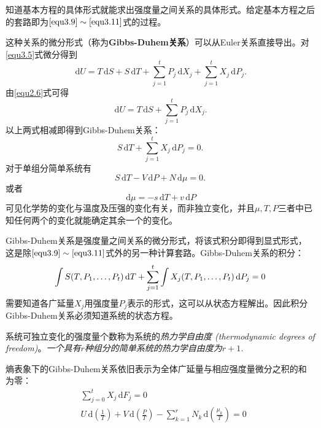 知道基本方程的具体形式就能求出强度量之间关系的具体形式。给定基本方程之后的套路即为$\eqref{equ3.9} \sim \eqref{equ3.11}$式的过程。

这种关系的微分形式（称为{\bf Gibbs-Duhem关系}）可以从Euler关系直接导出。对\eqref{equ3.5}式微分得到
\begin{equation}
\label{equ3.12}
	\,\mathrm dU = T\,\mathrm dS + S\,\mathrm dT + \sum_{j = 1}^t P_j \,\mathrm dX_j + \sum_{j = 1}^t X_j \,\mathrm dP_j.
\end{equation}
由\eqref{equ2.6}式可得
\begin{equation}
\label{equ3.13}
	\,\mathrm dU = T\,\mathrm dS + \sum_{j = 1}^t P_j \,\mathrm dX_j.
\end{equation}
以上两式相减即得到Gibbs-Duhem关系：
\begin{equation}
\label{equ3.14}
	S\,\mathrm dT + \sum_{j = 1}^t X_j \,\mathrm dP_j = 0.
\end{equation}
对于单组分简单系统有
\begin{equation}
\label{equ3.15}
	S\,\mathrm dT - V\,\mathrm dP + N\,\mathrm d\mu = 0.
\end{equation}
或者
\begin{equation}
\label{equ3.16}
	\,\mathrm d\mu = -s\,\mathrm dT + v\,\mathrm dP
\end{equation}
可见化学势的变化与温度及压强的变化有关，而非独立变化，并且$\mu, T, P$三者中已知任何两个的变化就能确定其余一个的变化。

Gibbs-Duhem关系是强度量之间关系的微分形式，将该式积分即得到显式形式，这是除$\eqref{equ3.9} \sim \eqref{equ3.11}$式外的另一种计算套路。Gibbs-Duhem关系的积分：
\[
	\int S(T, P_1, \dots, P_t) \,\mathrm{d} T + \sum_{j = 1}^t \int X_j(T, P_1, \dots, P_t) \,\mathrm{d} P_j = 0
\]
需要知道各广延量$X_j$用强度量$P_j$表示的形式，这可以从状态方程解出。因此积分Gibbs-Duhem关系必须知道系统的状态方程。

系统可独立变化的强度量个数称为系统的{\it 热力学自由度 (thermodynamic degrees of freedom)}。{\it 一个具有$r$种组分的简单系统的热力学自由度为$r + 1$.}

熵表象下的Gibbs-Duhem关系依旧表示为全体广延量与相应强度量微分之积的和为零：
\begin{align}
	&\sum_{j = 0}^t X_j \,\mathrm dF_j = 0 \label{equ3.17} \\
	&U \,\mathrm d\left( \frac{1}{T} \right) + V \,\mathrm d\left( \frac{P}{T} \right) - \sum_{k = 1}^r N_k \,\mathrm d\left( \frac{\mu_k}{T}\right) = 0 \label{equ3.18}
\end{align}



